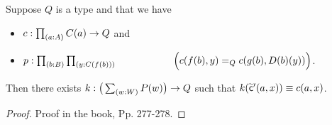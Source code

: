 \documentclass[centering]{report}
\newenvironment{slide}
    {\newpage
    \vspace*{\fill}
    }
    {
     \vspace*{\fill}
    }
\begin{document}
\begin{slide}
\begin{lem}\label{thm:flattening-rectnd}
  Suppose $Q$ is a type and that we have\\[2mm]
  \begin{itemize}
  \item $c : \prd{a:A} C(a) \to Q$ and
  \item $p : \prd{b:B}{y:C(f(b))}\\
  \hspace*{20mm}\Big(c(f(b),y) =_Q c(g(b),D(b)(y))\Big)$.
  \end{itemize}
  \vspace*{2mm}
  Then there exists $k:\big(\sm{w:W} P(w)\big) \to Q$ such that $k(\widetilde{\mathsf{c}}'(a,x)) \equiv c(a,x)$.
\end{lem}
\begin{proof} Proof in the book, Pp. 277-278.
\end{proof}
\end{slide}
\end{document}

